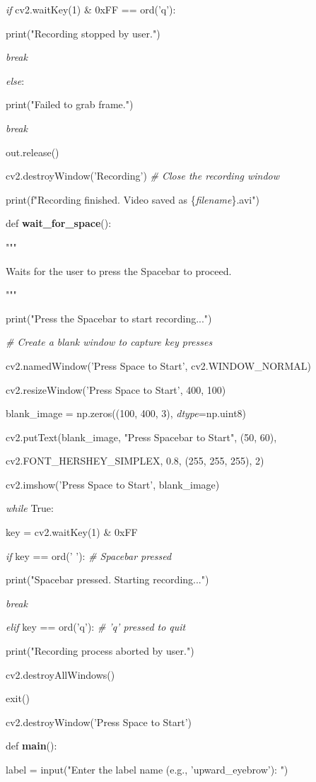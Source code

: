 \documentclass[
]{article}
\begin{document}
\emph{if} cv2.waitKey(1) \& 0xFF == ord('q'):

print("Recording stopped by user.")

\emph{break}

\emph{else}:

print("Failed to grab frame.")

\emph{break}

out.release()

cv2.destroyWindow('Recording') \emph{\# Close the recording window}

print(f"Recording finished. Video saved as \{\emph{filename}\}.avi")

def \textbf{wait\_for\_space}():

"""

Waits for the user to press the Spacebar to proceed.

"""

print("Press the Spacebar to start recording...")

\emph{\# Create a blank window to capture key presses}

cv2.namedWindow('Press Space to Start', cv2.WINDOW\_NORMAL)

cv2.resizeWindow('Press Space to Start', 400, 100)

blank\_image = np.zeros((100, 400, 3), \emph{dtype}=np.uint8)

cv2.putText(blank\_image, "Press Spacebar to Start", (50, 60),

cv2.FONT\_HERSHEY\_SIMPLEX, 0.8, (255, 255, 255), 2)

cv2.imshow('Press Space to Start', blank\_image)

\emph{while} True:

key = cv2.waitKey(1) \& 0xFF

\emph{if} key == ord(' '): \emph{\# Spacebar pressed}

print("Spacebar pressed. Starting recording...")

\emph{break}

\emph{elif} key == ord('q'): \emph{\# 'q' pressed to quit}

print("Recording process aborted by user.")

cv2.destroyAllWindows()

exit()

cv2.destroyWindow('Press Space to Start')

def \textbf{main}():

label = input("Enter the label name (e.g., 'upward\_eyebrow'): ")
\end{document}
